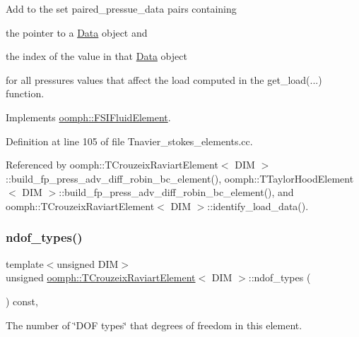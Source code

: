 Add to the set {\ttfamily paired\+\_\+pressue\+\_\+data} pairs containing
\begin{DoxyItemize}
\item the pointer to a \hyperlink{classoomph_1_1Data}{Data} object and
\item the index of the value in that \hyperlink{classoomph_1_1Data}{Data} object
\end{DoxyItemize}for all pressures values that affect the load computed in the {\ttfamily get\+\_\+load}(...) function. 

Implements \hyperlink{classoomph_1_1FSIFluidElement_af8e0805b769b7d111eb71f223fc83df8}{oomph\+::\+F\+S\+I\+Fluid\+Element}.



Definition at line 105 of file Tnavier\+\_\+stokes\+\_\+elements.\+cc.



Referenced by oomph\+::\+T\+Crouzeix\+Raviart\+Element$<$ D\+I\+M $>$\+::build\+\_\+fp\+\_\+press\+\_\+adv\+\_\+diff\+\_\+robin\+\_\+bc\+\_\+element(), oomph\+::\+T\+Taylor\+Hood\+Element$<$ D\+I\+M $>$\+::build\+\_\+fp\+\_\+press\+\_\+adv\+\_\+diff\+\_\+robin\+\_\+bc\+\_\+element(), and oomph\+::\+T\+Crouzeix\+Raviart\+Element$<$ D\+I\+M $>$\+::identify\+\_\+load\+\_\+data().

\mbox{\label{classoomph_1_1TCrouzeixRaviartElement_af9e4fcbc56441522e6111962438a3b4a}} 
\subsubsection{\texorpdfstring{ndof\+\_\+types()}{ndof\_types()}}
{\footnotesize\ttfamily template$<$unsigned D\+IM$>$ \\
unsigned \hyperlink{classoomph_1_1TCrouzeixRaviartElement}{oomph\+::\+T\+Crouzeix\+Raviart\+Element}$<$ D\+IM $>$\+::ndof\+\_\+types (\begin{DoxyParamCaption}{ }\end{DoxyParamCaption}) const\hspace{0.3cm}{\ttfamily [inline]}, {\ttfamily [virtual]}}



The number of \char`\"{}\+D\+O\+F types\char`\"{} that degrees of freedom in this element. 

